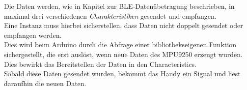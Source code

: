 Die Daten werden, wie in Kapitel zur BLE-Datenübetragung beschrieben, in maximal
drei verschiedenen \textit{Charakteristiken} gesendet und empfangen. \\
Eine Instanz muss hierbei sicherstellen, dass Daten
nicht doppelt gesendet oder empfangen werden.\\
Dies wird beim Arduino durch die Abfrage einer bibliothekseigenen Funktion
sichergestellt, die erst auslöst, wenn neue Daten des MPU9250 erzeugt wurden. Dies bewirkt
das Bereitstellen der Daten in den Characteristics.\\
Sobald diese Daten gesendet wurden, bekommt das Handy ein Signal und liest
daraufhin die neuen Daten.
